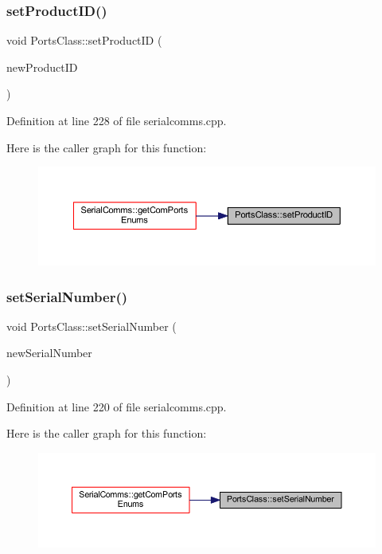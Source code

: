 \subsubsection{\texorpdfstring{setProductID()}{setProductID()}}
{\footnotesize\ttfamily void Ports\+Class\+::set\+Product\+ID (\begin{DoxyParamCaption}\item[{Q\+String}]{new\+Product\+ID }\end{DoxyParamCaption})}



Definition at line 228 of file serialcomms.\+cpp.

Here is the caller graph for this function\+:
\nopagebreak
\begin{figure}[H]
\begin{center}
\leavevmode
\includegraphics[width=350pt]{classPortsClass_a2bee64115fdaa041202522a909e66e00_icgraph}
\end{center}
\end{figure}
\mbox{\label{classPortsClass_a42d72f9dd8aff882cb338efe798f1721}} 
\subsubsection{\texorpdfstring{setSerialNumber()}{setSerialNumber()}}
{\footnotesize\ttfamily void Ports\+Class\+::set\+Serial\+Number (\begin{DoxyParamCaption}\item[{Q\+String}]{new\+Serial\+Number }\end{DoxyParamCaption})}



Definition at line 220 of file serialcomms.\+cpp.

Here is the caller graph for this function\+:
\nopagebreak
\begin{figure}[H]
\begin{center}
\leavevmode
\includegraphics[width=350pt]{classPortsClass_a42d72f9dd8aff882cb338efe798f1721_icgraph}
\end{center}
\end{figure}
\mbox{\label{classPortsClass_af42f48bd88679919b34f19f0f05673c1}} 
